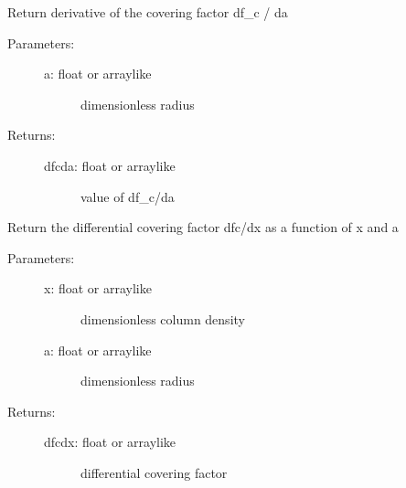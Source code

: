 \documentclass[letterpaper,10pt,english]{sphinxmanual}
\begin{document}
\begin{fulllineitems}
\begin{fulllineitems}
\label{fulldoc:despotic.winds.pwind.dfcda}
Return derivative of the covering factor df\_c / da
\begin{description}
\item[{Parameters:}] \leavevmode\begin{description}
\item[{a: float or arraylike}] \leavevmode
dimensionless radius

\end{description}

\item[{Returns:}] \leavevmode\begin{description}
\item[{dfcda: float or arraylike}] \leavevmode
value of df\_c/da

\end{description}

\end{description}

\end{fulllineitems}


\begin{fulllineitems}
\label{fulldoc:despotic.winds.pwind.dfcdx}
Return the differential covering factor dfc/dx as a
function of x and a
\begin{description}
\item[{Parameters:}] \leavevmode\begin{description}
\item[{x: float or arraylike}] \leavevmode
dimensionless column density

\item[{a: float or arraylike}] \leavevmode
dimensionless radius

\end{description}

\item[{Returns:}] \leavevmode\begin{description}
\item[{dfcdx: float or arraylike}] \leavevmode
differential covering factor

\end{description}

\end{description}


\end{fulllineitems}
\end{fulllineitems}
\end{document}
